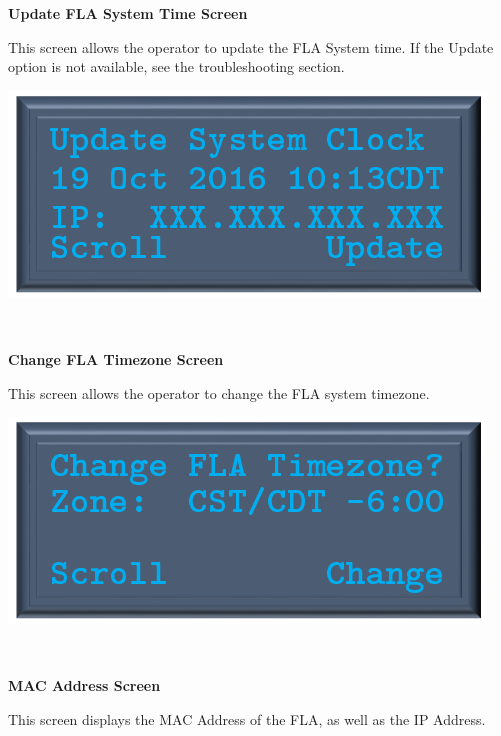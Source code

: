 \documentclass[11pt, oneside]{book}
\begin{document}
\noindent\begin{minipage}{0.45\textwidth}%
	\begin{center}
		\textbf{Update FLA System Time Screen}
	\end{center}
	This screen allows the operator to update the FLA System time.
	If the Update option is not available, see the troubleshooting section.
\end{minipage}%
\hfill%
\begin{minipage}{0.45\textwidth} 
	\includegraphics[width=\linewidth]{../media/pstricks_files/09_update_system_clock}
\end{minipage}\\[\baselineskip]
\noindent\begin{minipage}{0.45\textwidth}%
	\begin{center}
		\textbf{Change FLA Timezone Screen}
	\end{center}
	This screen allows the operator to change the FLA system timezone.
\end{minipage}%
\hfill%
\begin{minipage}{0.45\textwidth} 
	\includegraphics[width=\linewidth]{../media/pstricks_files/10_change_time_zone}
\end{minipage}\\[\baselineskip]
\noindent\begin{minipage}{0.45\textwidth}%
	\begin{center}
		\textbf{MAC Address Screen}\label{subsec:finding_mac}
	\end{center}
	This screen displays the MAC Address of the FLA, as well as the IP Address.
\end{minipage}%
\end{document}

